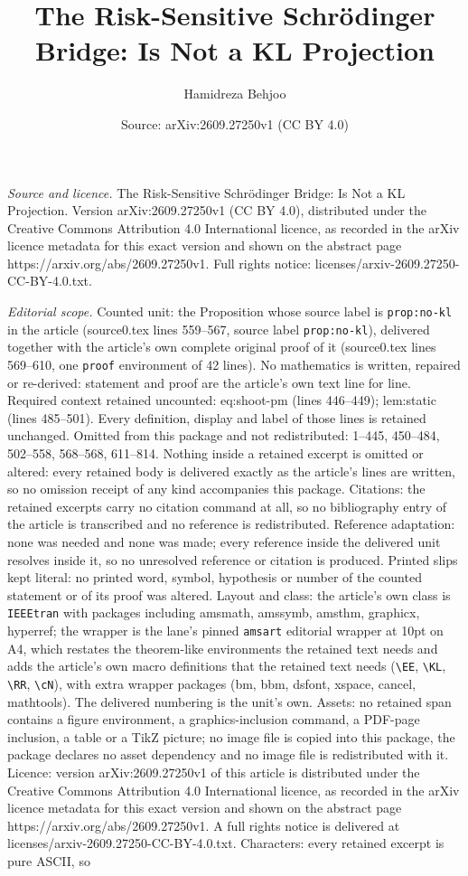 \documentclass[10pt,a4paper]{amsart}
\title[The Risk-Sensitive Schr\"odinger Bridge: Is Not a KL Project]{The Risk-Sensitive Schr\"odinger Bridge: Is Not a KL Projection}
\author{Hamidreza Behjoo}
\date{Source: arXiv:2609.27250v1 (CC BY 4.0)}
\begin{document}
\maketitle

\noindent\emph{Source and licence.} The Risk-Sensitive Schr\"odinger Bridge: Is Not a KL Projection. Version arXiv:2609.27250v1 (CC BY 4.0), distributed under the Creative Commons Attribution 4.0 International licence, as recorded in the arXiv licence metadata for this exact version and shown on the abstract page https://arxiv.org/abs/2609.27250v1. Full rights notice: licenses/arxiv-2609.27250-CC-BY-4.0.txt.\par\smallskip

\noindent\textit{Editorial scope.} Counted unit: the Proposition whose source label is \texttt{prop:no-kl} in the article (source0.tex lines 559--567, source label \texttt{prop:no-kl}), delivered together with the article's own complete original proof of it (source0.tex lines 569--610, one \texttt{proof} environment of 42 lines). No mathematics is written, repaired or re-derived: statement and proof are the article's own text line for line. Required context retained uncounted: eq:shoot-pm (lines 446--449); lem:static (lines 485--501). Every definition, display and label of those lines is retained unchanged. Omitted from this package and not redistributed: 1--445, 450--484, 502--558, 568--568, 611--814. Nothing inside a retained excerpt is omitted or altered: every retained body is delivered exactly as the article's lines are written, so no omission receipt of any kind accompanies this package. Citations: the retained excerpts carry no citation command at all, so no bibliography entry of the article is transcribed and no reference is redistributed. Reference adaptation: none was needed and none was made; every reference inside the delivered unit resolves inside it, so no unresolved reference or citation is produced. Printed slips kept literal: no printed word, symbol, hypothesis or number of the counted statement or of its proof was altered. Layout and class: the article's own class is \texttt{IEEEtran} with packages including amsmath, amssymb, amsthm, graphicx, hyperref; the wrapper is the lane's pinned \texttt{amsart} editorial wrapper at 10pt on A4, which restates the theorem-like environments the retained text needs and adds the article's own macro definitions that the retained text needs (\texttt{\textbackslash EE}, \texttt{\textbackslash KL}, \texttt{\textbackslash RR}, \texttt{\textbackslash cN}), with extra wrapper packages (bm, bbm, dsfont, xspace, cancel, mathtools). The delivered numbering is the unit's own. Assets: no retained span contains a figure environment, a graphics-inclusion command, a PDF-page inclusion, a table or a TikZ picture; no image file is copied into this package, the package declares no asset dependency and no image file is redistributed with it. Licence: version arXiv:2609.27250v1 of this article is distributed under the Creative Commons Attribution 4.0 International licence, as recorded in the arXiv licence metadata for this exact version and shown on the abstract page https://arxiv.org/abs/2609.27250v1. A full rights notice is delivered at licenses/arxiv-2609.27250-CC-BY-4.0.txt. Characters: every retained excerpt is pure ASCII, so 
\end{document}
